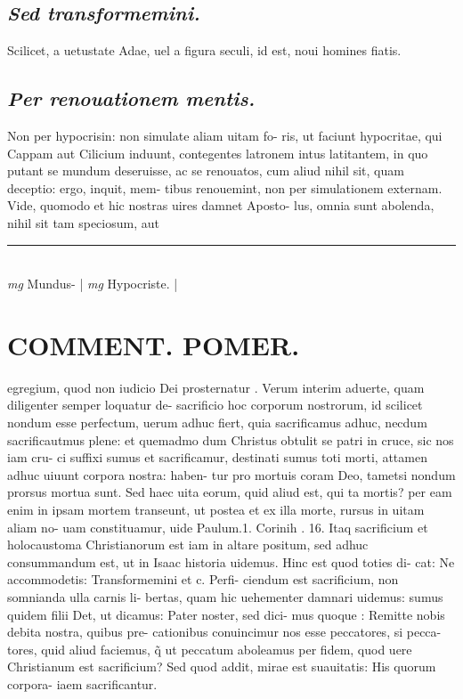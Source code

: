\documentclass{article}
\begin{document}
\begin{pages}
\subsection*{\textit{Sed transformemini. }}\pstart Scilicet, a uetustate Adae, uel a figura seculi, id est, noui homines fiatis.  \pend
{}
{}
\subsection*{\textit{Per renouationem mentis. }}\pstart Non per hypocrisin: non simulate aliam uitam fo- ris, ut faciunt hypocritae, qui Cappam aut Cilicium induunt, contegentes latronem intus latitantem, in quo putant se mundum deseruisse, ac se renouatos, cum aliud nihil sit, quam deceptio: ergo, inquit, mem- tibus renouemint, non per simulationem externam. Vide, quomodo et hic nostras uires damnet Aposto- lus, omnia sunt abolenda, nihil sit tam speciosum, aut  \pend
\vspace{0.5cm}\noindent
\vspace{0.2cm}\rule{1cm}{0.2pt}\\ 
\hspace{0.2cm}\textit{mg}
\footnotesize Mundus- 
\normalsize| 
\hspace{0.2cm}\textit{mg}
\footnotesize Hypocriste. 
\normalsize| 
\section*{COMMENT. POMER.  }\pstart egregium, quod non iudicio Dei prosternatur . Verum interim aduerte, quam diligenter semper loquatur de- sacrificio hoc corporum nostrorum, id scilicet nondum esse perfectum, uerum adhuc fiert, quia sacrificamus adhuc, necdum sacrificautmus plene: et quemadmo dum Christus obtulit se patri in cruce, sic nos iam cru- ci suffixi sumus et sacrificamur, destinati sumus toti morti, attamen adhuc uiuunt corpora nostra: haben- tur pro mortuis coram Deo, tametsi nondum prorsus mortua sunt. Sed haec uita eorum, quid aliud est, qui ta mortis? per eam enim in ipsam mortem transeunt, ut postea et ex illa morte, rursus in uitam aliam no- uam constituamur, uide Paulum.1. Corinih . 16.  Itaq sacrificium et holocaustoma Christianorum est iam in altare positum, sed adhuc consummandum est, ut in Isaac historia uidemus. Hinc est quod toties di- cat: Ne accommodetis: Transformemini et c. Perfi- ciendum est sacrificium, non somnianda ulla carnis li- bertas, quam hic uehementer damnari uidemus: sumus quidem filii Det, ut dicamus: Pater noster, sed dici- mus quoque : Remitte nobis debita nostra, quibus pre- cationibus conuincimur nos esse peccatores, si pecca- tores, quid aliud faciemus, q̃ ut peccatum aboleamus per fidem, quod uere Christianum est sacrificium? Sed quod addit, mirae est suauitatis: His quorum corpora- iaem sacrificantur.  \pend
{}
{}

\end{pages}
\end{document}
